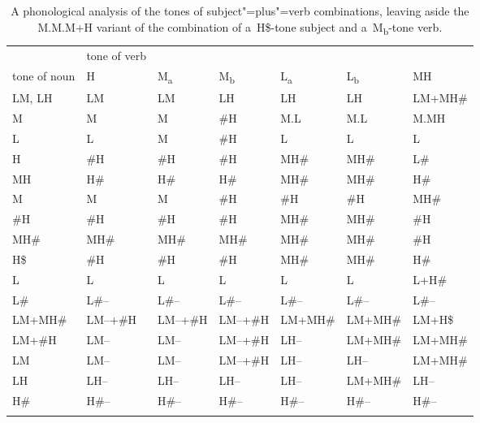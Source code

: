 \begin{sidewaystable}[p]
	\caption{\label{tab:subjectverbcombinations}A phonological analysis of the tones of subject"=plus"=verb combinations, 
		leaving aside the M.M.M+H variant of the combination of a~H\$-tone subject and a~M\textsubscript{b}-tone verb.}
	\begin{tabularx}{\textheight}{ l Q Q Q Q Q Q }
		\lsptoprule
		& tone of verb & & & & &\\ 
		tone of noun & H & M\textsubscript{a} & M\textsubscript{b} & L\textsubscript{a} & L\textsubscript{b} & MH\\ \midrule
		LM, LH & LM & LM & LH & LH & LH & LM+MH\#\\
		M & M & M & \#H & M.L & M.L & M.MH\\
		L & L & M & \#H & L & L & L\\
		H & \#H & \#H & \#H & MH\# & MH\# & L\#\\
		MH & H\# & H\# & H\# & MH\# & MH\# & H\#\\ \addlinespace \hdashline \addlinespace
		M & M & M & \#H & \#H & \#H & MH\#\\
		\#H & \#H & \#H & \#H & MH\# & MH\# & \#H\\
		MH\# & MH\# & MH\# & MH\# & MH\# & MH\# & \#H\\
		H\$ & \#H & \#H & \#H & MH\# & MH\# & H\#\\
		L & L & L & L & L & L & L+H\#\\
		L\# & L\#-- & L\#-- & L\#-- & L\#-- & L\#-- & L\#--\\
		LM+MH\# & LM--+\#H  & LM--+\#H  & LM--+\#H  & LM+MH\# & LM+MH\# & LM+H\$\\
		LM+\#H & LM-- & LM-- & LM--+\#H  & LH-- & LM+MH\# & LM+MH\#\\
		LM & LM-- & LM-- & LM--+\#H  & LH-- & LH-- & LM+MH\#\\
		LH & LH-- & LH-- & LH-- & LH-- & LM+MH\# & LH--\\
		H\# & H\#-- & H\#-- & H\#-- & H\#-- & H\#-- & H\#--\\
		\lspbottomrule
	\end{tabularx}
\end{sidewaystable}


